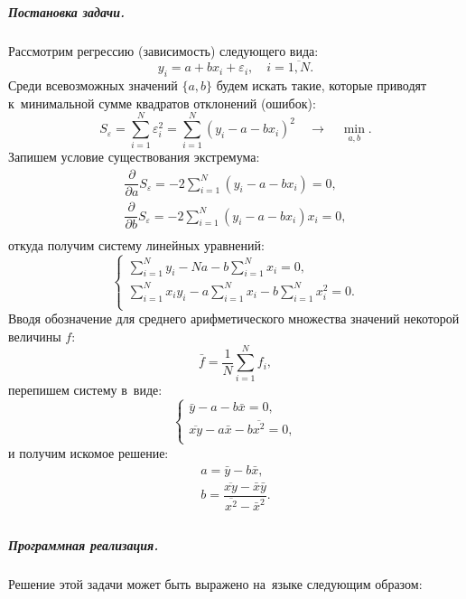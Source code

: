 \subparagraph{Постановка задачи.}
Рассмотрим регрессию (зависимость) следующего вида:
\begingroup
\newcommand{\SumN}{\ensuremath{\sum\limits_{i=1}^{N}}}
\begin{equation}\label{eq:linearmodel}
y_i = a + b x_i + \varepsilon_i,\quad i = \overline{1, N}.
\end{equation}
Среди всевозможных значений \(\{ a, b \}\) будем искать такие, которые приводят к~минимальной сумме квадратов отклонений (ошибок):
\[
S_{\varepsilon} = \SumN \varepsilon_i^2 = \SumN (y_i - a - b x_i)^2\quad\rightarrow\quad \min\limits_{a, b}.
\]
Запишем условие существования экстремума:
\[
\begin{array}{l}
    \dfrac{\partial}{\partial a} S_{\varepsilon} = -2 \SumN (y_i - a - b x_i) = 0, \\[2ex]
    \dfrac{\partial}{\partial b} S_{\varepsilon} = -2 \SumN (y_i - a - b x_i) x_i = 0, \\
\end{array}
\]
откуда получим систему линейных уравнений:
\[
\left\{ \begin{array}{l}
    \SumN y_i - N a - b\SumN x_i = 0, \\[2ex]
    \SumN x_i y_i - a\SumN x_i - b\SumN x_i^2 = 0. \\
\end{array} \right.
\]
Вводя обозначение для среднего арифметического множества значений некоторой величины \(f\):
\[
\bar f = \dfrac{1}{N}\SumN f_i,
\]
перепишем систему в~виде:
\[
\left\{ \begin{array}{l}
    \bar y - a - b\bar x = 0, \\
    \overline{x y} - a\bar x - b\overline{x^2} = 0, \\
\end{array} \right.
\]
и получим искомое решение:
\[
\boxed{ \begin{array}{l}
        a = \bar y - b\bar x, \\
        b = \dfrac{\overline{x y} - \bar x\bar y}{\overline{x^2} - \bar x^2}. \\
\end{array} }
\]
\endgroup



\subparagraph{Программная реализация.}
Решение этой задачи может быть выражено на~языке  следующим образом:\label{code:lsm}




